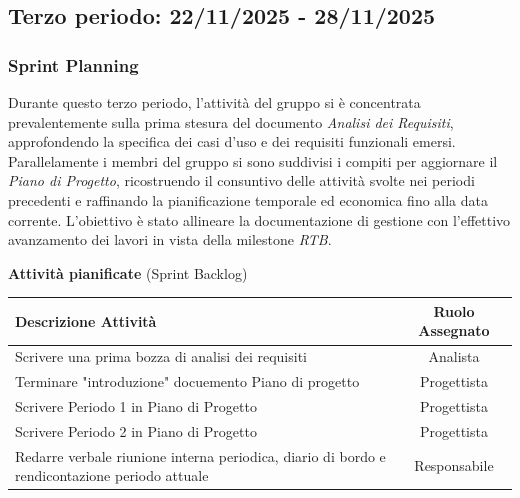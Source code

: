 \documentclass[a4paper, 11pt, oneside]{scrartcl} %
\begin{document}

\subsection{Terzo periodo: 22/11/2025 - 28/11/2025}

\subsubsection*{Sprint Planning}

Durante questo terzo periodo, l'attività del gruppo si è concentrata prevalentemente sulla prima stesura del documento \textit{Analisi dei Requisiti}, approfondendo la specifica dei casi d'uso e dei requisiti funzionali emersi. \\Parallelamente i membri del gruppo si sono suddivisi i compiti per aggiornare il \textit{Piano di Progetto}, ricostruendo il consuntivo delle attività svolte nei periodi precedenti e raffinando la pianificazione temporale ed economica fino alla data corrente. L'obiettivo è stato allineare la documentazione di gestione con l'effettivo avanzamento dei lavori in vista della milestone \textit{RTB}.

\begin{table}[!ht]
\vspace{0.2cm}
\centering
{\large \textbf{Attività pianificate} (Sprint Backlog)} \\
\vspace{0.3cm}
\renewcommand{\arraystretch}{1.4}
\begin{tabularx}{\textwidth}{|X|c|} 
\hline
\rowcolor{white} 
\textbf{Descrizione Attività} & \textbf{Ruolo Assegnato} \\
\hline
Scrivere una prima bozza di analisi dei requisiti & Analista \\
Terminare "introduzione" docuemento Piano di progetto & Progettista \\
Scrivere Periodo 1 in Piano di Progetto & Progettista \\
Scrivere Periodo 2 in Piano di Progetto & Progettista \\ 
Redarre verbale riunione interna periodica, diario di bordo e rendicontazione periodo attuale & Responsabile \\
\hline
\end{tabularx}
\end{table}
\FloatBarrier
\end{document}

